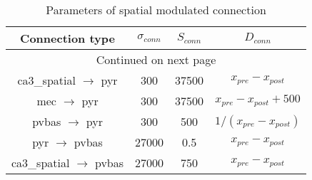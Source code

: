 \begin{longtable}{cccc}
\caption{Parameters of spatial modulated connection}\label{spat_conn}\\
\toprule
Connection type & $\sigma_{conn}$ & $S_{conn}$ & $D_{conn}$ \\
\midrule
\endhead
\midrule
\multicolumn{4}{c}{{Continued on next page}} \\
\midrule
\endfoot

\bottomrule
\endlastfoot
ca3\_spatial $\rightarrow$  pyr  & 300 &    37500 &  $x_{pre} - x_{post}$  \\
mec $\rightarrow$  pyr  &   300 &     37500        &  $x_{pre} - x_{post} + 500$\\
pvbas $\rightarrow$ pyr &   300 &      500       &  $1/(x_{pre} - x_{post})$\\
pyr $\rightarrow$ pvbas  &   27000   &     0.5 &  $x_{pre} - x_{post}$\\
ca3\_spatial $\rightarrow$ pvbas        &   27000  &      750 &  $x_{pre} - x_{post}$\\
\end{longtable}
